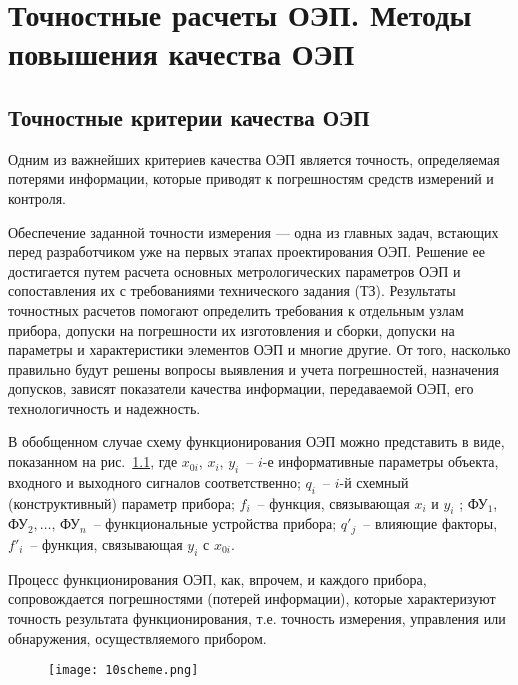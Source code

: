 \chapter{Точностные расчеты ОЭП. Методы повышения качества ОЭП}
\section{Точностные критерии качества ОЭП}

Одним из важнейших критериев качества ОЭП является точность, определяемая потерями информации, которые приводят к погрешностям средств измерений и контроля.

Обеспечение заданной точности измерения --- одна из главных задач, встающих перед разработчиком уже на первых этапах проектирования ОЭП. Решение ее достигается путем расчета основных метрологических параметров ОЭП и сопоставления их с требованиями технического задания (ТЗ). Результаты точностных расчетов помогают определить требования к отдельным узлам прибора, допуски на погрешности их изготовления и сборки, допуски на параметры и характеристики элементов ОЭП и многие другие. От того, насколько правильно будут решены вопросы выявления и учета погрешностей, назначения допусков, зависят показатели качества информации, передаваемой ОЭП, его технологичность и надежность.

В обобщенном случае схему функционирования ОЭП можно представить в виде, показанном на рис.~\ref{pic:10scheme}, где $ x_{0i} $, $ x_i $, $ y_i $~-- $ i $-е информативные параметры объекта, входного и выходного сигналов соответственно; $ q_i $~-- $ i $-й схемный (конструктивный) параметр прибора; $ f_i $~-- функция, связывающая $ x_i $ и $ y_i $ ; $ \text{ФУ}_1 $, $ \text{ФУ}_2,\ldots,\,\text{ФУ}_n $~-- функциональные устройства прибора; $ q'_j $~-- влияющие факторы, $ f'_i $~-- функция, связывающая $ y_i $ с $ x_{0i} $.

Процесс функционирования ОЭП, как, впрочем, и каждого прибора, сопровождается погрешностями (потерей информации), которые характеризуют точность результата функционирования, т.е. точность измерения, управления или обнаружения, осуществляемого прибором.

\begin{figure}[h!]
	\texttt{[image: 10scheme.png]}
	\label{pic:10scheme}
\end{figure}

